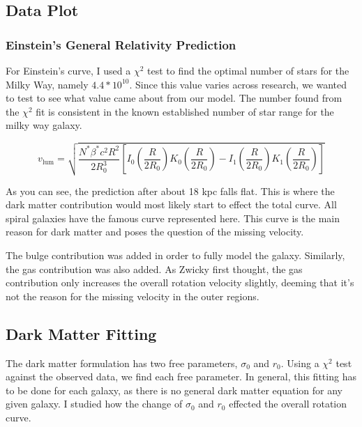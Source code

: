 \documentclass[titlepage]{article}
\begin{document}
\subsection{Data Plot}



\subsubsection{Einstein's General Relativity Prediction}

For Einstein's curve, I used a $\chi^2$ test to find the optimal number of stars for the Milky Way, namely $4.4*10^{10}$. Since this value varies across research, we wanted to test to see what value came about from our model. The number found from the {$\chi^2$} fit is consistent in the known established number of star range for the milky way galaxy.


\begin{equation}
v_{\text{lum}} = \sqrt{\frac{N^*\beta^*c^2R^2}{2R^3_0}\left[I_0\left(\frac{R}{2R_0}\right)K_0\left(\frac{R}{2R_0}\right)-I_1\left(\frac{R}{2R_0}\right)K_1\left(\frac{R}{2R_0}\right)\right]}
\end{equation}

As you can see, the prediction after about 18 kpc falls flat. This is where the dark matter contribution would most likely start to effect the total curve. All spiral galaxies have the famous curve represented here. This curve is the main reason for dark matter and poses the question of the missing velocity.

The bulge contribution was added in order to fully model the galaxy. Similarly, the gas contribution was also added. As Zwicky first thought, the gas contribution only increases the overall rotation velocity slightly, deeming that it's not the reason for the missing velocity in the outer regions.
 
\subsection{Dark Matter Fitting}

The dark matter formulation has two free parameters, $\sigma_0$ and $r_0$. Using a $\chi^2$ test against the observed data, we find each free parameter. In general, this fitting has to be done for each galaxy, as there is no general dark matter equation for any given galaxy. I studied how the change of $\sigma_0$ and $r_0$ effected the overall rotation curve. 
\end{document}

